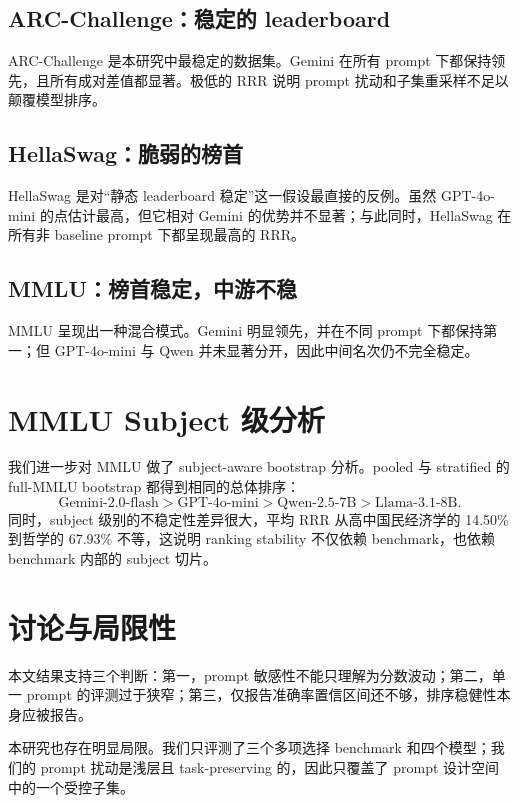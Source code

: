 \documentclass[11pt,a4paper]{ctexart}
\begin{document}
\subsection{ARC-Challenge：稳定的 leaderboard}

ARC-Challenge 是本研究中最稳定的数据集。Gemini 在所有 prompt 下都保持领先，且所有成对差值都显著。极低的 RRR 说明 prompt 扰动和子集重采样不足以颠覆模型排序。

\subsection{HellaSwag：脆弱的榜首}

HellaSwag 是对“静态 leaderboard 稳定”这一假设最直接的反例。虽然 GPT-4o-mini 的点估计最高，但它相对 Gemini 的优势并不显著；与此同时，HellaSwag 在所有非 baseline prompt 下都呈现最高的 RRR。

\subsection{MMLU：榜首稳定，中游不稳}

MMLU 呈现出一种混合模式。Gemini 明显领先，并在不同 prompt 下都保持第一；但 GPT-4o-mini 与 Qwen 并未显著分开，因此中间名次仍不完全稳定。

\section{MMLU Subject 级分析}

我们进一步对 MMLU 做了 subject-aware bootstrap 分析。pooled 与 stratified 的 full-MMLU bootstrap 都得到相同的总体排序：
\[
\text{Gemini-2.0-flash} > \text{GPT-4o-mini} > \text{Qwen-2.5-7B} > \text{Llama-3.1-8B}.
\]
同时，subject 级别的不稳定性差异很大，平均 RRR 从高中国民经济学的 14.50\% 到哲学的 67.93\% 不等，这说明 ranking stability 不仅依赖 benchmark，也依赖 benchmark 内部的 subject 切片。

\section{讨论与局限性}

本文结果支持三个判断：第一，prompt 敏感性不能只理解为分数波动；第二，单一 prompt 的评测过于狭窄；第三，仅报告准确率置信区间还不够，排序稳健性本身应被报告。

本研究也存在明显局限。我们只评测了三个多项选择 benchmark 和四个模型；我们的 prompt 扰动是浅层且 task-preserving 的，因此只覆盖了 prompt 设计空间中的一个受控子集。
\end{document}
